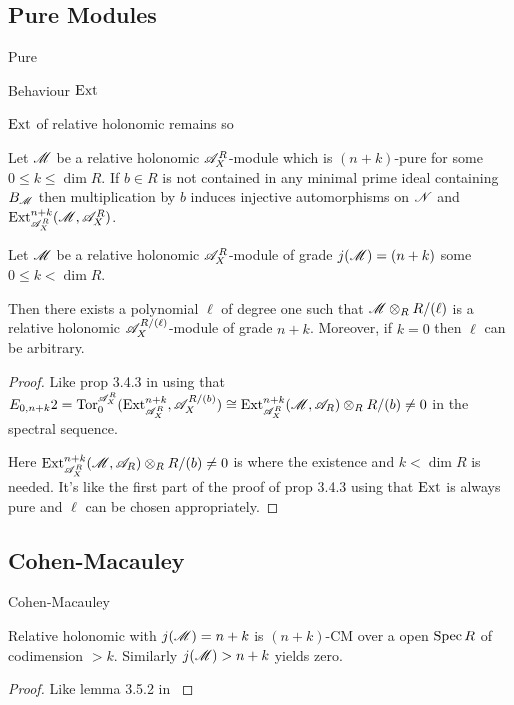 \subsection{Pure Modules}
\begin{definition}
  Pure
\end{definition}
\begin{lemma}
  Behaviour $\operatorname{Ext}$
\end{lemma}
\begin{lemma}
  $\operatorname{Ext}$ of relative holonomic remains so
\end{lemma}
\begin{lemma}\label{lem: NotBernsteinInjectiveAutomorphism}
  Let $\mathscr{M}$ be a relative holonomic $\mathscr{A}_X^R$-module which is $(n+k)$-pure for some $0\leq k \leq \dim R$. If $b\in R$ is not contained in any minimal prime ideal containing $B_{\mathscr{M}}$ then multiplication by $b$ induces injective automorphisms on $\mathscr{N}$ and $\operatorname{Ext}^{n+k}_{\mathscr{A}_X^R}(\mathscr{M},\mathscr{A}_X^R)$.
\end{lemma}
\begin{lemma}\label{lem: RestrictToCM}
  Let $\mathscr{M}$ be a relative holonomic $\mathscr{A}_X^R$-module of grade $j(\mathscr{M}) = (n+k)$ some $0\leq k < \dim R$.

  Then there exists a polynomial $\ell$ of degree one such that $\mathscr{M} \otimes_R R/(\ell)$ is a relative holonomic  $\mathscr{A}_X^{R/(\ell)}$-module of grade $n+k$. Moreover, if $k=0$ then $\ell$ can be arbitrary.
\end{lemma}
\begin{proof}
  Like prop 3.4.3 in \cite{budur2019zero} using that $E_{0,n+k}2 = \operatorname{Tor}_0^{\mathscr{A}_X^R}(\operatorname{Ext}_{\mathscr{A}_X^R}^{n+k},\mathscr{A}_{X}^{R/(b)}) \cong \operatorname{Ext}_{\mathscr{A}_X^R}^{n+k}(\mathscr{M},\mathscr{A}_R)\otimes_{R}R/(b) \neq 0$ in the spectral sequence.

  Here $\operatorname{Ext}_{\mathscr{A}_X^R}^{n+k}(\mathscr{M},\mathscr{A}_R)\otimes_{R}R/(b) \neq 0$ is where the existence and $k<\dim R$ is needed. It's like the first part of the proof of prop 3.4.3 using that $\operatorname{Ext}$ is always pure and $\ell$ can be chosen appropriately.
\end{proof}
\subsection{Cohen-Macauley}
\begin{definition}
  Cohen-Macauley
\end{definition}
\begin{lemma}\label{lem: GradeToCMOverOpen}
  Relative holonomic with $j(\mathscr{M})= n+k$ is $(n+k)$-CM over a open $\operatorname{Spec} R$ of codimension $>k$. Similarly $j(\mathscr{M})> n+k$ yields zero.
\end{lemma}
\begin{proof}
  Like lemma 3.5.2 in \cite{budur2019zero}
\end{proof}



